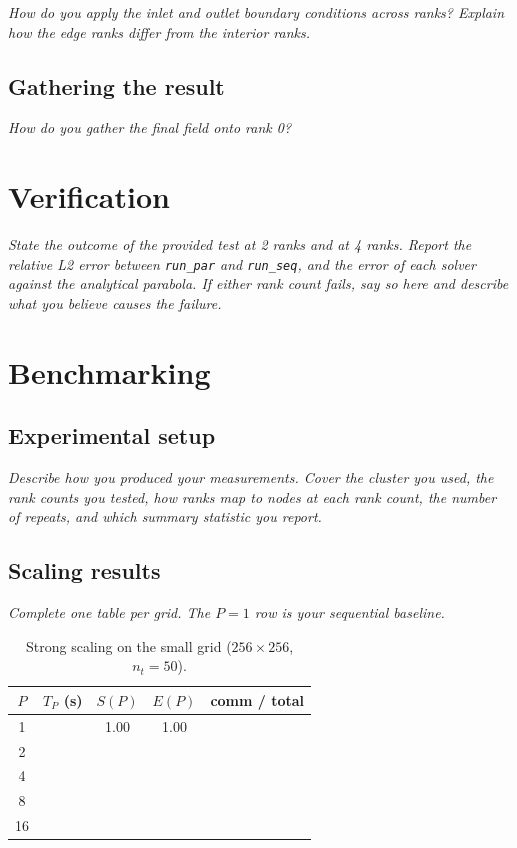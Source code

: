 \documentclass[11pt]{article}
\newcommand{\prompt}[1]{{\itshape\color{gray}#1\par}\medskip}
\begin{document}
\prompt{How do you apply the inlet and outlet boundary conditions across ranks? Explain how the
edge ranks differ from the interior ranks.}

\subsection*{Gathering the result}

\prompt{How do you gather the final field onto rank 0?}

\section{Verification}

\prompt{State the outcome of the provided test at 2 ranks and at 4 ranks. Report the relative L2
error between \texttt{run\_par} and \texttt{run\_seq}, and the error of each solver against the
analytical parabola. If either rank count fails, say so here and describe what you believe causes
the failure.}

\section{Benchmarking}

\subsection*{Experimental setup}

\prompt{Describe how you produced your measurements. Cover the cluster you used, the rank counts
you tested, how ranks map to nodes at each rank count, the number of repeats, and which summary
statistic you report.}

\subsection*{Scaling results}

\prompt{Complete one table per grid. The $P = 1$ row is your sequential baseline.}

\begin{table}[H]
\centering
\begin{tabular}{@{}ccccc@{}}
\toprule
$P$ & $T_P$ (s) & $S(P)$ & $E(P)$ & comm / total \\
\midrule
1  & & 1.00 & 1.00 & \\
2  & & & & \\
4  & & & & \\
8  & & & & \\
16 & & & & \\
\bottomrule
\end{tabular}
\caption{Strong scaling on the small grid ($256 \times 256$, $n_t = 50$).}
\label{tab:small}
\end{table}
\end{document}
